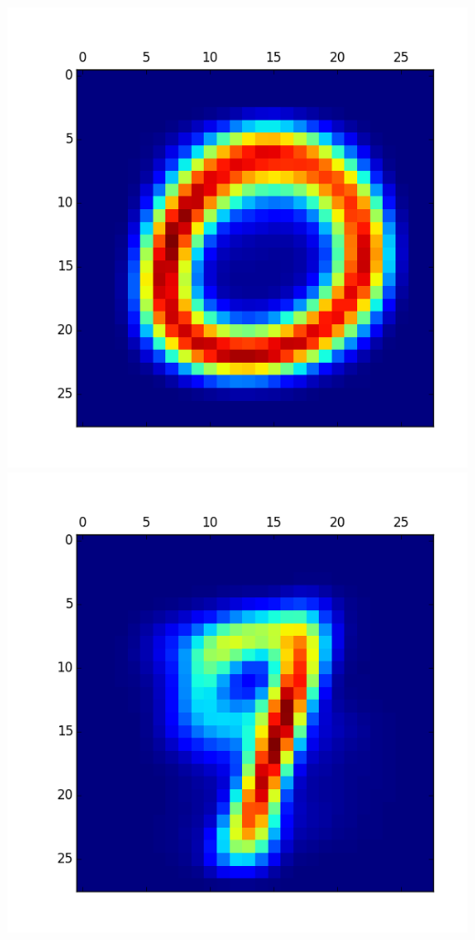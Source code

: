 \documentclass[11pt]{article}
\begin{document}
\begin{itemize}
\includegraphics[scale = 0.5]{18.png}
\includegraphics[scale = 0.5]{19.png}


\end{itemize}
\end{document}
